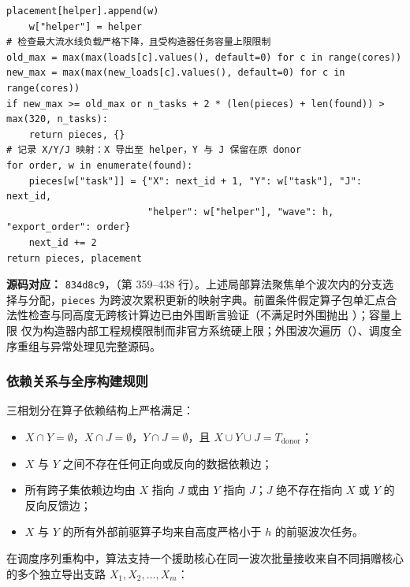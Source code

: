 \documentclass[anonymous,withtoc]{gmcm2026}
\providecommand{\tightlist}{\setlength{\itemsep}{0pt}\setlength{\parskip}{0pt}}
\begin{document}
\begin{tcolorbox}
\begin{lstlisting}[style=paperpseudo]
    placement[helper].append(w)
    w["helper"] = helper
# 检查最大流水线负载严格下降，且受构造器任务容量上限限制
old_max = max(max(loads[c].values(), default=0) for c in range(cores))
new_max = max(max(new_loads[c].values(), default=0) for c in range(cores))
if new_max >= old_max or n_tasks + 2 * (len(pieces) + len(found)) > max(320, n_tasks):
    return pieces, {}
# 记录 X/Y/J 映射：X 导出至 helper，Y 与 J 保留在原 donor
for order, w in enumerate(found):
    pieces[w["task"]] = {"X": next_id + 1, "Y": w["task"], "J": next_id,
                         "helper": w["helper"], "wave": h, "export_order": order}
    next_id += 2
return pieces, placement
\end{lstlisting}
\textbf{源码对应：} \texttt{834d8c9}，\texttt{}（第 359--438 行）。上述局部算法聚焦单个波次内的分支选择与分配，\texttt{pieces} 为跨波次累积更新的映射字典。前置条件假定算子包单汇点合法性检查与同高度无跨核计算边已由外围断言验证（不满足时外围抛出 \texttt{}）；容量上限 \texttt{} 仅为构造器内部工程规模限制而非官方系统硬上限；外围波次遍历（\texttt{}）、调度全序重组与异常处理见完整源码。

\end{tcolorbox}\endgroup

\subsubsection{依赖关系与全序构建规则}

三相划分在算子依赖结构上严格满足：

\begin{itemize}
\tightlist
\item
  \(X \cap Y = \emptyset\)，\(X \cap J = \emptyset\)，\(Y \cap J = \emptyset\)，且 \(X \cup Y \cup J = T_{\mathrm{donor}}\)；
\item
  \(X\) 与 \(Y\) 之间不存在任何正向或反向的数据依赖边；
\item
  所有跨子集依赖边均由 \(X\) 指向 \(J\) 或由 \(Y\) 指向 \(J\)；\(J\) 绝不存在指向 \(X\) 或 \(Y\) 的反向反馈边；
\item
  \(X\) 与 \(Y\) 的所有外部前驱算子均来自高度严格小于 \(h\) 的前驱波次任务。
\end{itemize}

在调度序列重构中，算法支持一个援助核心在同一波次批量接收来自不同捐赠核心的多个独立导出支路 \(X_1, X_2, \dots, X_m\)：
\end{document}
